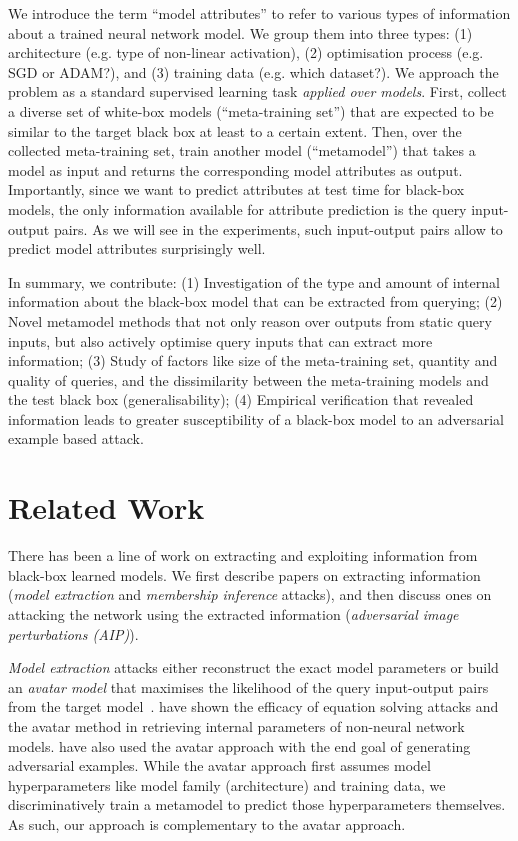 \documentclass{article} %
\begin{document}
We introduce the term ``model attributes'' to refer to various types of information about a trained neural network model. We group them into three types: (1) architecture (e.g. type of non-linear activation), (2) optimisation process (e.g. SGD or ADAM?), and (3) training data (e.g. which dataset?). We approach the problem as a standard supervised learning task \emph{applied over models}. First, collect a diverse set of white-box models (``meta-training set'') that are expected to be similar to the target black box at least to a certain extent. Then, over the collected meta-training set, train another model (``metamodel'') that takes a model as input and returns the corresponding model attributes as output. Importantly, since we want to predict attributes at test time for black-box models, the only information available for attribute prediction is the query input-output pairs. As we will see in the experiments, such input-output pairs allow to predict model attributes surprisingly well. 

In summary, we contribute:
(1) Investigation of the type and amount of internal information about the black-box model that can be extracted from querying;
(2) Novel metamodel methods that not only reason over outputs from static query inputs, but also actively optimise query inputs that can extract more information;
(3) Study of factors like size of the meta-training set, quantity and quality of queries, and the dissimilarity between the meta-training models and the test black box (generalisability);
(4) Empirical verification that revealed information leads to greater susceptibility of a black-box model to an adversarial example based attack.

\section{Related Work}

There has been a line of work on extracting and exploiting information from black-box learned models. We first describe papers on extracting information (\emph{model extraction} and \emph{membership inference} attacks), and then discuss ones on attacking the network using the extracted information (\emph{adversarial image perturbations (AIP)}).

\emph{Model extraction} attacks either reconstruct the exact model parameters or build an \emph{avatar model} that maximises the likelihood of the query input-output pairs from the target model~\citep{tramer16usenix,papernot2017practical}. \citet{tramer16usenix} have shown the efficacy of equation solving attacks and the avatar method in retrieving internal parameters of non-neural network models. \citet{papernot2017practical} have also used the avatar approach with the end goal of generating adversarial examples. While the avatar approach first assumes model hyperparameters like model family (architecture) and training data, we discriminatively train a metamodel to predict those hyperparameters themselves. As such, our approach is complementary to the avatar approach.
\end{document}
